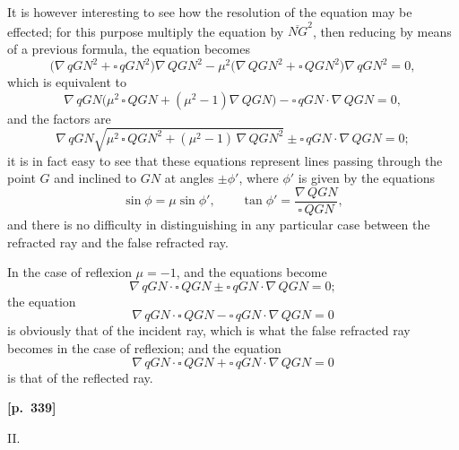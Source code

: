 \documentclass[11pt]{article}
\begin{document}
It is however interesting to see how the resolution of the equation may be effected; for this purpose multiply the equation by $\overline{NG}^{2}$, then reducing by means of a previous formula, the equation becomes
\[
\bigl(\nabla\, qGN^{2} + \square\, qGN^{2}\bigr)\nabla\, QGN^{2} - \mu^{2}\bigl(\nabla\, QGN^{2} + \square\, QGN^{2}\bigr)\nabla\, qGN^{2} = 0,
\]
which is equivalent to
\[
\nabla\, qGN\bigl(\mu^{2}\,\square\, QGN + (\mu^{2}-1)\nabla\, QGN\bigr) - \square\, qGN\cdot \nabla\, QGN = 0,
\]
and the factors are
\[
\nabla\, qGN\sqrt{\mu^{2}\,\square\, QGN^{2} + (\mu^{2}-1)\,\nabla\, QGN^{2}} \pm \square\, qGN\cdot \nabla\, QGN = 0;
\]
it is in fact easy to see that these equations represent lines passing through the point $G$ and inclined to $GN$ at angles $\pm\phi'$, where $\phi'$ is given by the equations
\[
\sin\phi = \mu\sin\phi',\qquad \tan\phi' = \frac{\nabla\, QGN}{\square\, QGN},
\]
and there is no difficulty in distinguishing in any particular case between the refracted ray and the false refracted ray.

In the case of reflexion $\mu = -1$, and the equations become
\[
\nabla\, qGN\cdot\square\, QGN \pm \square\, qGN\cdot \nabla\, QGN = 0;
\]
the equation
\[
\nabla\, qGN\cdot\square\, QGN - \square\, qGN\cdot \nabla\, QGN = 0
\]
is obviously that of the incident ray, which is what the false refracted ray becomes in the case of reflexion; and the equation
\[
\nabla\, qGN\cdot\square\, QGN + \square\, qGN\cdot \nabla\, QGN = 0
\]
is that of the reflected ray.

\medskip
\noindent\textbf{[p.~339]}
\begin{center}II.\end{center}
\end{document}

